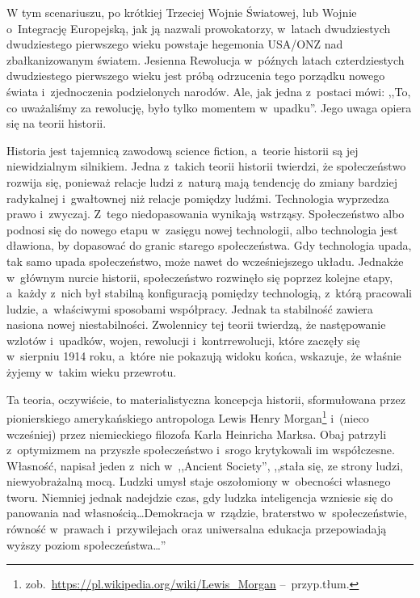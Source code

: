 \documentclass[oneside,polish,11pt,sfheadings]{mwbk}
\begin{document}
W tym scenariuszu, po krótkiej Trzeciej Wojnie Światowej, lub Wojnie o~Integrację Europejską, jak ją nazwali prowokatorzy, w~latach
dwudziestych dwudziestego pierwszego wieku powstaje hegemonia USA/ONZ
nad zbałkanizowanym światem. Jesienna Rewolucja w~późnych latach
czterdziestych dwudziestego pierwszego wieku jest próbą odrzucenia tego
porządku nowego świata i~zjednoczenia podzielonych narodów. Ale, jak
jedna z~postaci mówi: ,,To, co uważaliśmy za rewolucję, było tylko
momentem w~upadku''. Jego uwaga opiera się na teorii historii.

Historia jest tajemnicą zawodową science fiction, a~teorie historii są
jej niewidzialnym silnikiem. Jedna z~takich teorii historii twierdzi, że
społeczeństwo rozwija się, ponieważ relacje ludzi z~naturą mają
tendencję do zmiany bardziej radykalnej i~gwałtownej niż relacje
pomiędzy ludźmi. Technologia wyprzedza prawo i~zwyczaj. Z~tego
niedopasowania wynikają wstrząsy. Społeczeństwo albo podnosi się do
nowego etapu w~zasięgu nowej technologii, albo technologia jest
dławiona, by dopasować do granic starego społeczeństwa. Gdy technologia
upada, tak samo upada społeczeństwo, może nawet do wcześniejszego
układu. Jednakże w~głównym nurcie historii, społeczeństwo rozwinęło się
poprzez kolejne etapy, a~każdy z~nich był stabilną konfiguracją pomiędzy
technologią, z~którą pracowali ludzie, a~właściwymi sposobami
współpracy. Jednak ta stabilność zawiera nasiona nowej niestabilności.
Zwolennicy tej teorii twierdzą, że następowanie wzlotów i~upadków,
wojen, rewolucji i~kontrrewolucji, które zaczęły się w~sierpniu 1914
roku, a~które nie pokazują widoku końca, wskazuje, że właśnie żyjemy w~takim wieku przewrotu.

Ta teoria, oczywiście, to materialistyczna koncepcja historii,
sformułowana przez pionierskiego amerykańskiego antropologa Lewis Henry
Morgan\footnote{zob.~\url{https://pl.wikipedia.org/wiki/Lewis\_Morgan} --~przyp.tłum.} i~(nieco
wcześniej) przez niemieckiego filozofa Karla Heinricha Marksa. Obaj
patrzyli z~optymizmem na przyszłe społeczeństwo i~srogo krytykowali im
współczesne. Własność, napisał jeden z~nich w~,,Ancient Society'', ,,stała się, ze strony ludzi, niewyobrażalną mocą.
Ludzki umysł staje oszołomiony w~obecności własnego tworu. Niemniej
jednak nadejdzie czas, gdy ludzka inteligencja wzniesie się do panowania
nad własnością\ldots Demokracja w~rządzie, braterstwo w~społeczeństwie,
równość w~prawach i~przywilejach oraz uniwersalna edukacja przepowiadają
wyższy poziom społeczeństwa\ldots ''
\end{document}
